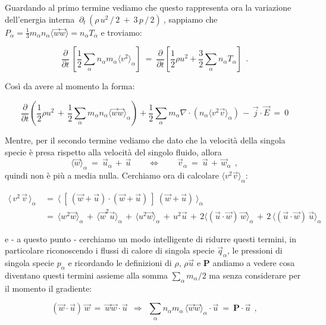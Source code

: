 Guardando al primo termine vediamo che questo rappresenta ora la variazione dell'energia interna $\ \partial_t\, \left( \rho\, u^2\, /\, 2\ +\ 3\, p\, /\, 2 \right)\ $, sappiamo che $P_\alpha = \frac{1}{3} m_\alpha n_\alpha \langle \vec w\vec w \rangle = n_\alpha T_\alpha$ e troviamo:

\[ \frac{\partial}{\partial t} \,\left[\frac{1}{2} \sum_\alpha n_\alpha m_\alpha \langle v^2 \rangle_\alpha \right]\ =\ \frac{\partial}{\partial t } \left[\frac{1}{2} \rho u^2 + \frac{3}{2} \sum_\alpha n_\alpha T_\alpha\right]\ \ . \]

Così da avere al momento la forma:

\[\frac{\partial}{\partial t} \left(\frac{1}{2}\rho u^2 \,+\,\frac{1}{2} \sum_\alpha m_\alpha n_\alpha \langle\vec w\vec w\rangle_\alpha\right) + \frac{1}{2} \sum_\alpha m_\alpha \nabla \cdot (n_\alpha \langle v^2 \vec v\rangle_\alpha)\, -\, \vec j\cdot \vec E\ =\ 0\]


Mentre, per il secondo termine vediamo che dato che la velocità della singola specie è presa rispetto alla velocità del singolo fluido, allora 
\[\langle \vec w\rangle_\alpha\ =\ \vec u_\alpha\, +\, \vec u \qquad \iff \qquad \vec v_\alpha\ =\ \vec u\, +\, \vec w_\alpha\ \ ,\]
quindi non è più a media nulla. Cerchiamo ora di calcolare $\langle v^2 \vec v\rangle_\alpha$:

\[ \begin{aligned}\langle\, v^2\, \vec v\,\rangle_\alpha\ 
&=\ \langle\ [\ (\vec w +\vec u)\cdot(\vec w + \vec u)\ ]\ (\vec w + \vec u)\ \rangle_\alpha \\ 
&=\ \langle w^2 \vec w\rangle_\alpha\, +\,\langle \vec w^2 \vec u\rangle_\alpha\, +\, \langle u^2 \vec w\rangle_\alpha\, +\, u^2\vec u\, +\, 2\langle (\vec u\cdot \vec w)\,\vec w\rangle_\alpha\, +\, 2\,\langle (\vec u\cdot \vec w)\,\vec u\rangle_\alpha
\end{aligned} \]

e - a questo punto - cerchiamo un modo intelligente di ridurre questi termini, in particolare riconoscendo i flussi di calore di singola specie $\vec q_\alpha$, le pressioni di singola specie $p_\alpha$ e ricordando le definizioni di $\rho$, $\rho\vec u$ e $\mathbf{P}$ andiamo a vedere cosa diventano questi termini assieme alla somma $\sum_\alpha m_\alpha/2$ ma senza considerare per il momento il gradiente:


\[ (\vec w\cdot \vec u) \, \vec w\ =\ \vec w \vec w\cdot \vec u\ \ \Rightarrow\ \ \sum_\alpha n_\alpha m_\alpha \, \langle \vec w \vec w \rangle_\alpha \cdot \vec u\ =\ \mathbf{P}\cdot \vec u\ \ ,\]

